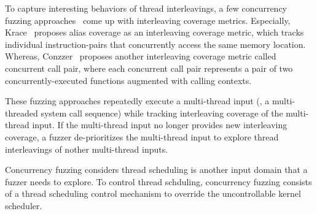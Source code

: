To capture interesting behaviors of thread interleavings, a few
concurrency fuzzing approaches~\cite{conzzer, muzz, krace} come up
with interleaving coverage metrics.
%
Especially, Krace~\cite{krace} proposes alias coverage as an
interleaving coverage metric, which tracks individual
instruction-pairs that \dr{}concurrently access the same memory location.
%
Whereas, Conzzer~\cite{conzzer} proposes another interleaving coverage
metric called concurrent call pair, where each concurrent call pair
represents a pair of two concurrently-executed functions augmented
with calling contexts. 

These fuzzing approaches repeatedly execute a multi-thread input (\ie,
a multi-threaded system call sequence) while tracking interleaving
coverage of the multi-thread input. If the multi-thread input no
longer provides new interleaving coverage, a fuzzer de-prioritizes the
multi-thread input to explore thread interleavings of nother
multi-thread inputs.











%
Concurrency fuzzing considers thread scheduling is another input
domain that a fuzzer needs to explore.
%
To control thread schduling, concurrency fuzzing consists of a thread
scheduling control mechanism to override the uncontrollable kernel
scheduler.


